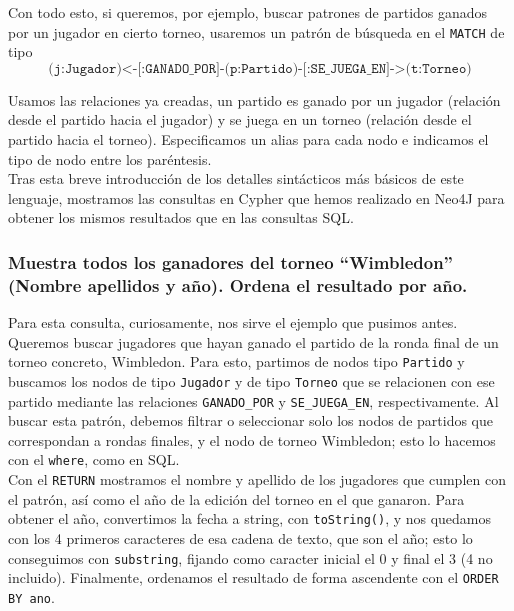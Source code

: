 Con todo esto, si queremos, por ejemplo, buscar patrones de partidos ganados por un jugador en cierto torneo, usaremos un patrón de búsqueda en el \texttt{MATCH} de tipo 
\begin{equation*}
    \texttt{(j:Jugador)<-[:GANADO\_POR]-(p:Partido)-[:SE\_JUEGA\_EN]->(t:Torneo)}
\end{equation*}

Usamos las relaciones ya creadas, un partido es ganado por un jugador (relación desde el partido hacia el jugador) y se juega en un torneo (relación desde el partido hacia el torneo). Especificamos un alias para cada nodo e indicamos el tipo de nodo entre los paréntesis. \\

Tras esta breve introducción de los detalles sintácticos más básicos de este lenguaje, mostramos las consultas en Cypher que hemos realizado en Neo4J para obtener los mismos resultados que en las consultas SQL. \\

\subsubsection{Muestra todos los ganadores del torneo ``Wimbledon'' (Nombre apellidos y año). Ordena el resultado por año.}

Para esta consulta, curiosamente, nos sirve el ejemplo que pusimos antes. Queremos buscar jugadores que hayan ganado el partido de la ronda final de un torneo concreto, Wimbledon. Para esto, partimos de nodos tipo \texttt{Partido} y buscamos los nodos de tipo \texttt{Jugador} y de tipo \texttt{Torneo} que se relacionen con ese partido mediante las relaciones \texttt{GANADO\_POR} y \texttt{SE\_JUEGA\_EN}, respectivamente. Al buscar esta patrón, debemos filtrar o seleccionar solo los nodos de partidos que correspondan a rondas finales, y el nodo de torneo Wimbledon; esto lo hacemos con el \texttt{where}, como en SQL. \\

Con el \texttt{RETURN} mostramos el nombre y apellido de los jugadores que cumplen con el patrón, así como el año de la edición del torneo en el que ganaron. Para obtener el año, convertimos la fecha a string, con \texttt{toString()}, y nos quedamos con los 4 primeros caracteres de esa cadena de texto, que son el año; esto lo conseguimos con \texttt{substring}, fijando como caracter inicial el 0 y final el 3 (4 no incluido). Finalmente, ordenamos el resultado de forma ascendente con el \texttt{ORDER BY ano}. \\

